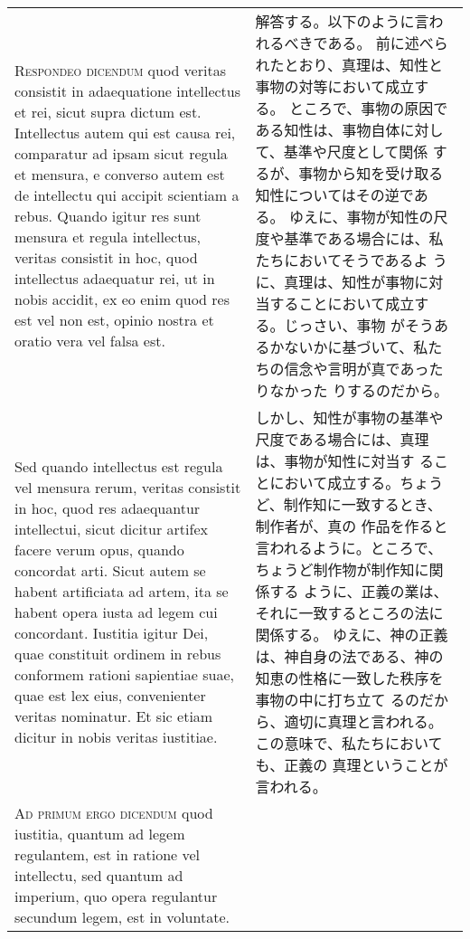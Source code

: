 \documentclass[10pt]{jsarticle} %
\begin{document}
{\begin{longtable}{p{21em}p{21em}}
\\


{\scshape Respondeo dicendum} quod veritas consistit in
adaequatione intellectus et rei, sicut supra dictum est. Intellectus
autem qui est causa rei, comparatur ad ipsam sicut regula et mensura, e
converso autem est de intellectu qui accipit scientiam a rebus. Quando
igitur res sunt mensura et regula intellectus, veritas consistit in hoc,
quod intellectus adaequatur rei, ut in nobis accidit, ex eo enim quod
res est vel non est, opinio nostra et oratio vera vel falsa est. 

&


解答する。以下のように言われるべきである。
前に述べられたとおり、真理は、知性と事物の対等において成立する。
ところで、事物の原因である知性は、事物自体に対して、基準や尺度として関係
 するが、事物から知を受け取る知性についてはその逆である。
ゆえに、事物が知性の尺度や基準である場合には、私たちにおいてそうであるよ
 うに、真理は、知性が事物に対当することにおいて成立する。じっさい、事物
 がそうあるかないかに基づいて、私たちの信念や言明が真であったりなかった
 りするのだから。

\\

Sed
quando intellectus est regula vel mensura rerum, veritas consistit in
hoc, quod res adaequantur intellectui, sicut dicitur artifex facere
verum opus, quando concordat arti. Sicut autem se habent artificiata ad
artem, ita se habent opera iusta ad legem cui concordant. Iustitia
igitur Dei, quae constituit ordinem in rebus conformem rationi
sapientiae suae, quae est lex eius, convenienter veritas nominatur. Et
sic etiam dicitur in nobis veritas iustitiae.


&

しかし、知性が事物の基準や尺度である場合には、真理は、事物が知性に対当す
 ることにおいて成立する。ちょうど、制作知に一致するとき、制作者が、真の
 作品を作ると言われるように。ところで、ちょうど制作物が制作知に関係する
 ように、正義の業は、それに一致するところの法に関係する。
ゆえに、神の正義は、神自身の法である、神の知恵の性格に一致した秩序を事物の中に打ち立て
 るのだから、適切に真理と言われる。この意味で、私たちにおいても、正義の
 真理ということが言われる。


\\


{\scshape Ad primum ergo dicendum} quod iustitia,
quantum ad legem regulantem, est in ratione vel intellectu, sed quantum
ad imperium, quo opera regulantur secundum legem, est in voluntate.



\end{longtable}}
\end{document}
